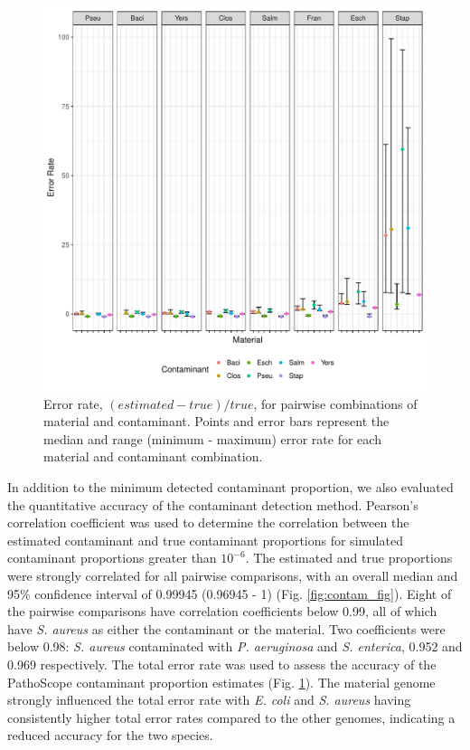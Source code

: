 \documentclass[fleqn,10pt,lineno]{wlpeerj}\usepackage[]{graphicx}\usepackage[]{color}
\makeatletter
\def\maxwidth{ %
  \ifdim\Gin@nat@width>\linewidth
    \linewidth
  \else
    \Gin@nat@width
  \fi
}
\newenvironment{knitrout}{}{} %
\makeatother
\begin{document}
\begin{knitrout}
\color{fgcolor}\begin{figure}
\includegraphics[width=\maxwidth]{figure/contam_resid-1} \caption[Error rate, $(estimated - true)/true$, for pairwise combinations of material and contaminant]{Error rate, $(estimated - true)/true$, for pairwise combinations of material and contaminant. Points and error bars represent the median and range (minimum - maximum) error rate for each material and contaminant combination.}\label{fig:contam_resid}
\end{figure}


\end{knitrout}

In addition to the minimum detected contaminant proportion, we also evaluated the quantitative accuracy of the contaminant detection method.
Pearson's correlation coefficient was used to determine the correlation between the estimated contaminant and true contaminant proportions for simulated contaminant proportions greater than $10^{-6}$.
The estimated and true proportions were strongly correlated for all pairwise comparisons, with an overall median and 95\% confidence interval of 0.99945 (0.96945 - 1) (Fig. \ref{fig:contam_fig}).
Eight of the pairwise comparisons have correlation coefficients below 0.99, all of which have \textit{S. aureus} as either the contaminant or the material.
Two coefficients were below 0.98: \textit{S. aureus} contaminated with \textit{P. aeruginosa} and \textit{S. enterica}, 0.952 and 0.969 respectively.
The total error rate was used to assess the accuracy of the PathoScope contaminant proportion estimates (Fig. \ref{fig:contam_resid}).
The material genome strongly influenced the total error rate with \textit{E. coli} and \textit{S. aureus} having consistently higher total error rates compared to the other genomes, indicating a reduced accuracy for the two species.
\end{document}
